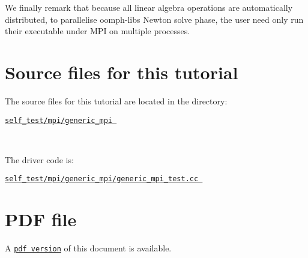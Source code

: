 We finally remark that because all linear algebra operations are automatically distributed, to parallelise {\ttfamily oomph-\/lib\textquotesingle{}s} Newton solve phase, the user need only run their executable under M\+PI on multiple processes.\hypertarget{index_sources}{}\section{Source files for this tutorial}\label{index_sources}

\begin{DoxyItemize}
\item The source files for this tutorial are located in the directory\+:~\newline
~\newline
\begin{center} \href{../../../../self_test/mpi/generic_mpi/}{\tt self\+\_\+test/mpi/generic\+\_\+mpi } \end{center} ~\newline

\item The driver code is\+: ~\newline
~\newline
\begin{center} \href{../../../../self_test/mpi/generic_mpi/generic_mpi_test.cc}{\tt self\+\_\+test/mpi/generic\+\_\+mpi/generic\+\_\+mpi\+\_\+test.\+cc } \end{center} 
\end{DoxyItemize}



 

 \hypertarget{index_pdf}{}\section{P\+D\+F file}\label{index_pdf}
A \href{../latex/refman.pdf}{\tt pdf version} of this document is available. 
